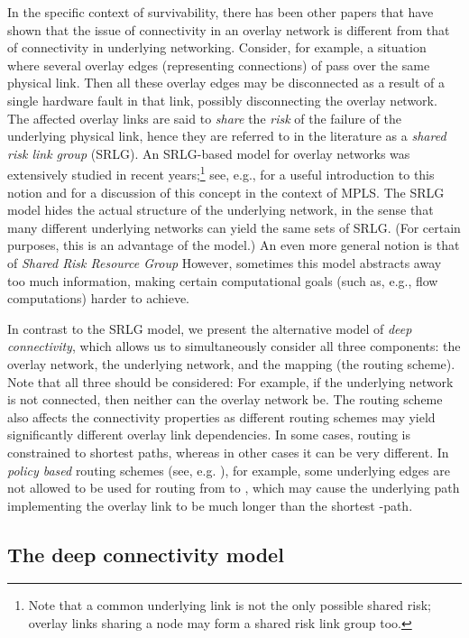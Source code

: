 \LongVersion \documentclass[11pt]{article}
\theoremstyle{definition}
\theoremstyle{plain}
\begin{document}
In the specific context of survivability, there has been other papers that
have shown  that the issue of connectivity in an overlay network is different
from that of connectivity in underlying networking.
Consider, for example,
a situation where several overlay edges (representing connections)
of  pass over the same physical link.
Then all these overlay edges may be disconnected as a result of a
single hardware fault in that link, possibly disconnecting the overlay network.
The affected overlay links are said to {\em share} the {\em risk}
of the failure of the underlying physical link, hence they are referred to
in the literature as a \emph{shared risk link group} (SRLG).
An SRLG-based model for overlay networks was extensively studied in recent
years;\footnote{
Note that a common underlying link is not the only possible shared risk;
overlay links sharing a node may form a shared risk link group too.
}
see, e.g., \cite{intro-srlg} for a useful introduction to this notion and
\cite{cisco-srlg} for a discussion of this concept in the context of MPLS.
The SRLG model hides the actual structure of the underlying network, in the
sense that many different underlying networks can yield the same sets of
SRLG.
(For certain purposes, this is an advantage of the model.)
An even more general notion is that of \emph{Shared Risk Resource Group}
However, sometimes this model abstracts away too much information,
making certain computational goals (such as, e.g., flow computations)
harder to achieve.


In contrast to the SRLG model, we present the alternative model of
\emph{deep connectivity}, which allows us to simultaneously consider all three
components: the overlay network, the underlying network, and the mapping (the
routing scheme).
Note that all three should be considered:
For example, if the underlying network is not connected, then neither can the
overlay network be.
The routing scheme also affects the connectivity properties as different
routing schemes may yield significantly different overlay link dependencies.
In some cases, routing is constrained to shortest paths, whereas in other
cases it can be very different.
In \emph{policy based} routing schemes (see, e.g. \cite{CiscoPolicy}), for
example, some underlying edges are not allowed to be used for routing from 
to , which may cause the underlying path implementing the overlay link  to be much longer than the shortest -path.

\subsection{The deep connectivity model}
\label{section:Model}
\end{document}

